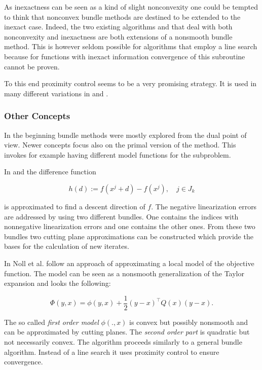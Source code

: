 As inexactness can be seen as a kind of slight nonconvexity one could be tempted to think that nonconvex bundle methods are destined to be extended to the inexact case. Indeed, the two existing algorithms \cite{Hare2016} and \cite{Noll2013} that deal with both nonconvexity and inexactness are both extensions of a nonsmooth bundle method.
This is however seldom possible for algorithms that employ a line search because for functions with inexact information convergence of this subroutine cannot be proven.

To this end proximity control seems to be a very promising strategy. It is used in many different variations in \cite{Apkarian2008, Lewis2015, Noll2010, Noll2005, Noll2012} and \cite{Schramm1992}.

\subsubsection{Other Concepts}

In the beginning bundle methods were mostly explored from the  dual point of view. Newer concepts focus also on the primal version of the method. This invokes for example having different model functions for the subproblem.

In \cite{Fuduli2004} and \cite{Fuduli2004a} the difference function 

\begin{equation*}
	h(d):= f(x^j +d) -f(x^j), \quad j \in J_k
\label{diff_fun}
\end{equation*}

is approximated to find a descent direction of \(f\).
The negative linearization errors are addressed by using two different bundles. One contains the indices with nonnegative linearization errors and one contains the other ones. From these two bundles two cutting plane approximations can be constructed which provide the bases for the calculation of new iterates.

In \cite{Noll2012} Noll et al. follow an approach of approximating a local model of the objective function. The model can be seen as a nonsmooth generalization of the Taylor expansion and looks the following:

\begin{equation*}
	\Phi(y,x) = \phi(y,x)+\frac{1}{2}(y-x)^{\top}Q(x)(y-x).
\label{quad_mod}
\end{equation*}

The so called \emph{first order model} \(\phi(.,x)\) is convex but possibly nonsmooth and can be approximated by cutting planes. The \emph{second order part} is quadratic but not necessarily convex. The algorithm proceeds similarly to a general bundle algorithm.
Instead of a line search it uses proximity control to ensure convergence.


